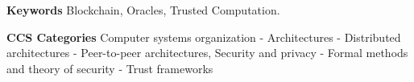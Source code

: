 \textbf{Keywords}
Blockchain,
Oracles,
Trusted Computation.
\newline

\textbf{CCS Categories}
Computer systems organization - Architectures - Distributed architectures - Peer-to-peer architectures,
Security and privacy - Formal methods and theory of security - Trust frameworks
